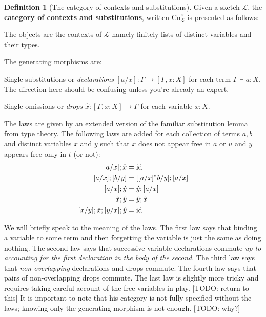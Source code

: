 \documentclass[12pt,twoside]{reedthesis}
\theoremstyle{definition}
\newtheorem{definition}{Definition}
\theoremstyle{remark}
\theoremstyle{theorem}
\begin{document}
\begin{definition}[The category of contexts and substitutions]
  Given a sketch $\mathcal{L}$, the \textbf{category of contexts and substitutions}, written \( \text{Cn}^{\times}_{\mathcal{L}}\) is presented as follows:
  \begin{outline}
    \1 The objects are the contexts of \( \mathcal{L} \) namely finitely lists
    of distinct variables and their types.

    \1 The generating morphisms are:

      \2 Single substitutions or \emph{declarations} \( [a/x] : \Gamma \rightarrow [\Gamma, x:X] \) for each term
      \( \Gamma \vdash a : X \). The direction here should be confusing unless you're already an expert.

      \2 Single omissions or \emph{drops} \( \hat{x} : [\Gamma, x : X] \rightarrow \Gamma \) for
      each variable $x:X$.

    \1 The laws are given by an extended version of the familiar substitution
      lemma from type theory. The following laws are added for each collection
      of terms $a,b$ and distinct variables $x$ and $y$ such that $x$ does
      not appear free in $a$ or $u$ and $y$ appears free only in $t$ (or not):
    \begin{align*}
      [a/x] ; \hat{x} &= \text{id} \\
      [a/x] ; [b/y]   &= [ [ a/x ]^{*} b/y ] ; [a/x] \\
      [a/x]; \hat{y} &= \hat{y}; [a/x] \\
      \hat{x}; \hat{y} &= \hat{y}; \hat{x} \\
      [x/y]; \hat{x}; [y/x]; \hat{y} &= \text{id}
    \end{align*}
  \end{outline}
  We will briefly speak to the meaning of the laws. The first law says that
  binding a variable to some term and then forgetting the variable is just the
  same as doing nothing. The second law says that successive variable
  declarations commute \emph{up to accounting for the first declaration in the
    body of the second}. The third law says that \emph{non-overlapping}
  declarations and drops commute. The fourth law says that pairs of
  non-overlapping drops commute. The last law is slightly more tricky and
  requires taking careful account of the free variables in play. [TODO: return
  to this] It is important to note that his category is not fully specified
  without the laws; knowing only the generating morphism is not enough. [TODO:
  why?]
\end{definition}
\end{document}
